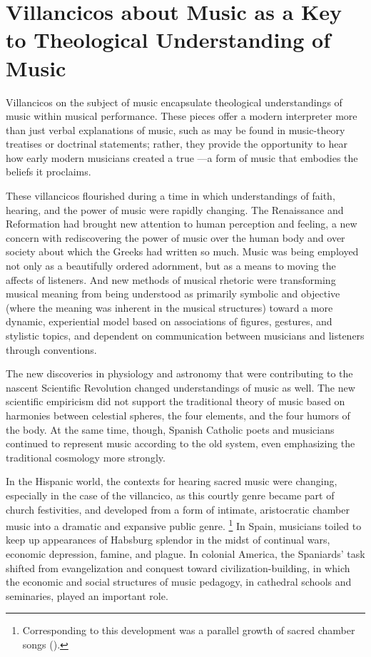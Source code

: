 
\section{%
Villancicos about Music as a Key to Theological Understanding of Music
}

Villancicos on the subject of music encapsulate theological understandings of music within musical performance.
These pieces offer a modern interpreter more than just verbal explanations of music, such as may be found in music-theory treatises or doctrinal statements; rather, they provide the opportunity to hear how early modern musicians created a true ---a form of music that embodies the beliefs it proclaims.

These villancicos flourished during a time in which understandings of faith, hearing, and the power of music were rapidly changing.
The Renaissance and Reformation had brought new attention to human perception and feeling, a new concern with rediscovering the power of music over the human body and over society about which the Greeks had written so much.
Music was being employed not only as a beautifully ordered adornment, but as a means to moving the affects of listeners.
And new methods of musical rhetoric were transforming musical meaning from being understood as primarily symbolic and objective (where the meaning was inherent in the musical structures) toward a more dynamic, experiential model based on associations of figures, gestures, and stylistic topics, and dependent on communication between musicians and listeners through conventions.

The new discoveries in physiology and astronomy that were contributing to the nascent Scientific Revolution changed understandings of music as well.%
	\autocite{Gouk:Sciences}
The new scientific empiricism did not support the traditional theory of music based on harmonies between celestial spheres, the four elements, and the four humors of the body.
At the same time, though, Spanish Catholic poets and musicians continued to represent music according to the old system, even emphasizing the traditional cosmology more strongly.

In the Hispanic world, the contexts for hearing sacred music were changing, especially in the case of the villancico, as this courtly genre became part of church festivities, and developed from a form of intimate, aristocratic chamber music into a dramatic and expansive public genre.%
	\footnote{%
	Corresponding to this development was a parallel growth of sacred chamber songs ().
	}
In Spain, musicians toiled to keep up appearances of Habsburg splendor in the midst of continual wars, economic depression, famine, and plague.
In colonial America, the Spaniards' task shifted from evangelization and conquest toward civilization-building, in which the economic and social structures of music pedagogy, in cathedral schools and seminaries, played an important role.


